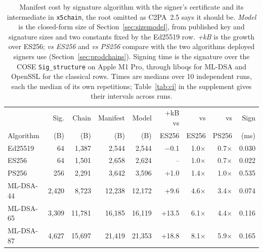 \begin{table}[t]
\caption{Manifest cost by signature algorithm with the signer's certificate and its intermediate in \texttt{x5chain}, the root omitted as C2PA~2.5 says it should be. \emph{Model} is the closed-form size of Section~\ref{sec:sizemodel}, from published key and signature sizes and two constants fixed by the Ed25519 row. \emph{+kB} is the growth over ES256; \emph{vs ES256} and \emph{vs PS256} compare with the two algorithms deployed signers use (Section~\ref{sec:prodchains}). Signing time is the signature over the COSE \texttt{Sig\_structure} on Apple M1 Pro, through liboqs for ML-DSA and OpenSSL for the classical rows. Times are medians over 10 independent runs, each the median of its own repetitions; Table~\ref{tab:ci} in the supplement gives their intervals across runs.}
\label{tab:pq}
\small
\setlength{\tabcolsep}{4pt}
\begin{tabular}{lrrrrrrrr}
\toprule
 & Sig. & Chain & Manifest & Model & +kB vs & vs & vs & Sign\\
Algorithm & (B) & (B) & (B) & (B) & ES256 & ES256 & PS256 & (ms)\\
\midrule
Ed25519 & 64 & 1,387 & 2,544 & 2,544 & $-$0.1 & 1.0$\times$ & 0.7$\times$ & 0.030\\
ES256 & 64 & 1,501 & 2,658 & 2,624 & -- & 1.0$\times$ & 0.7$\times$ & 0.022\\
PS256 & 256 & 2,291 & 3,642 & 3,596 & +1.0 & 1.4$\times$ & 1.0$\times$ & 0.535\\
ML-DSA-44 & 2,420 & 8,723 & 12,238 & 12,172 & +9.6 & 4.6$\times$ & 3.4$\times$ & 0.074\\
ML-DSA-65 & 3,309 & 11,781 & 16,185 & 16,119 & +13.5 & 6.1$\times$ & 4.4$\times$ & 0.116\\
ML-DSA-87 & 4,627 & 15,697 & 21,419 & 21,353 & +18.8 & 8.1$\times$ & 5.9$\times$ & 0.165\\
\bottomrule
\end{tabular}
\end{table}
